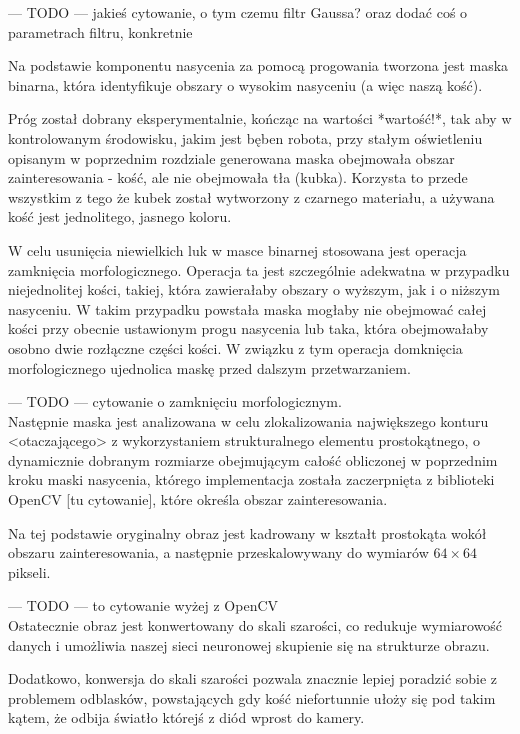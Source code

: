 --- TODO ---
jakieś cytowanie, o tym czemu filtr Gaussa?
oraz dodać coś o parametrach filtru, konkretnie

Na podstawie komponentu nasycenia za pomocą progowania tworzona jest maska binarna,
która identyfikuje obszary o wysokim nasyceniu (a więc naszą kość).

Próg został dobrany eksperymentalnie, kończąc na wartości *wartość!*, tak aby w kontrolowanym środowisku, jakim jest bęben robota,
przy stałym oświetleniu opisanym w poprzednim rozdziale generowana maska obejmowała obszar zainteresowania - kość, ale nie obejmowała tła (kubka).
Korzysta to przede wszystkim z tego że kubek został wytworzony z czarnego materiału, a używana kość jest jednolitego, jasnego koloru.

W celu usunięcia niewielkich luk w masce binarnej stosowana jest operacja zamknięcia morfologicznego.
Operacja ta jest szczególnie adekwatna w przypadku niejednolitej kości, takiej,
która zawierałaby obszary o wyższym, jak i o niższym nasyceniu.
W takim przypadku powstała maska mogłaby nie obejmować całej kości przy obecnie ustawionym progu nasycenia lub taka,
która obejmowałaby osobno dwie rozłączne części kości.
W związku z tym operacja domknięcia morfologicznego ujednolica maskę przed dalszym przetwarzaniem.

--- TODO --- cytowanie o zamknięciu morfologicznym. \\

Następnie maska jest analizowana w celu zlokalizowania największego konturu <otaczającego> z wykorzystaniem strukturalnego elementu prostokątnego,
o dynamicznie dobranym rozmiarze obejmującym całość obliczonej w poprzednim kroku maski nasycenia,
którego implementacja została zaczerpnięta z biblioteki OpenCV [tu cytowanie], które określa obszar zainteresowania.

Na tej podstawie oryginalny obraz jest kadrowany w kształt prostokąta wokół obszaru zainteresowania,
a następnie przeskalowywany do wymiarów $64 \times 64$ pikseli.

--- TODO --- to cytowanie wyżej z OpenCV \\

Ostatecznie obraz jest konwertowany do skali szarości, co redukuje wymiarowość danych
i umożliwia naszej sieci neuronowej skupienie się na strukturze obrazu.

Dodatkowo, konwersja do skali szarości pozwala znacznie lepiej poradzić sobie z problemem odblasków,
powstających gdy kość niefortunnie ułoży się pod takim kątem, że odbija światło którejś z diód wprost do kamery.


